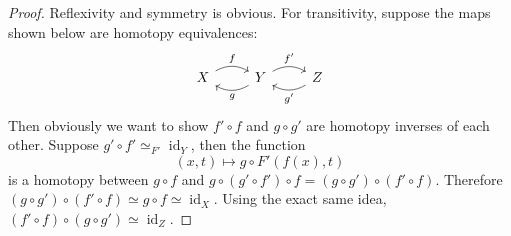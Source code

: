 \begin{proof}
    Reflexivity and symmetry is obvious.
    For transitivity, suppose the maps shown below are homotopy equivalences:
    \[
        \begin{tikzcd}
            X \arrow[bend left]{r}{f} & Y \arrow[bend left]{l}{g} \arrow[bend left]{r}{f'} & Z \arrow[bend left]{l}{g'}
        \end{tikzcd}
    \]
    Then obviously we want to show $f'\circ f$ and $g\circ g'$ are homotopy inverses of each other.
    Suppose $g'\circ f'\simeq_{F'}\operatorname{id}_Y$, then the function
    $$(x,t)\mapsto g\circ F'(f(x),t)$$
    is a homotopy between $g\circ f$ and $g\circ (g'\circ f')\circ f=(g\circ g')\circ (f'\circ f)$.
    Therefore $(g\circ g')\circ (f'\circ f)\simeq g\circ f\simeq \operatorname{id}_X$.
    Using the exact same idea, $(f'\circ f)\circ (g\circ g')\simeq\operatorname{id}_Z$.
\end{proof}
